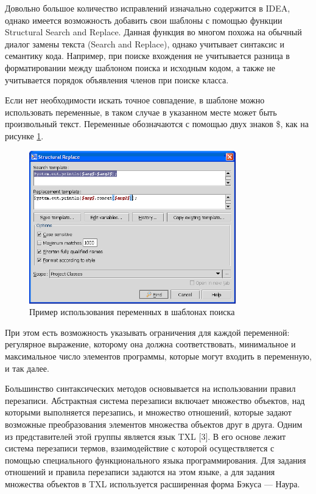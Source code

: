 Довольно большое количество исправлений изначально содержится в IDEA, однако имеется возможность добавить свои шаблоны с помощью функции Structural Search and Replace\cite{ideaSSR}. Данная функция во многом похожа на обычный диалог замены текста (Search and Replace), однако учитывает синтаксис и семантику кода. Например, при поиске вхождения не учитывается разница в форматировании между шаблоном поиска и исходным кодом, а также не учитывается порядок объявления членов при поиске класса.

Если нет необходимости искать точное совпадение, в шаблоне можно использовать переменные, в таком случае в указанном месте может быть произвольный текст. Переменные обозначаются с помощью двух знаков \$, как на рисунке \ref{fig:ssr}.

\begin{figure}[H]
	\centering
	\includegraphics[width=0.8\textwidth]{ssr.png}
	\caption{Пример использования переменных в шаблонах поиска}%
	\label{fig:ssr}
\end{figure}

При этом есть возможность указывать ограничения для каждой переменной: регулярное выражение, которому она должна соответствовать, минимальное и максимальное число элементов программы, которые могут входить в переменную, и так далее.

Большинство синтаксических методов основывается на использовании правил перезаписи. Абстрактная система перезаписи включает множество объектов, над которыми выполняется перезапись, и множество отношений, которые задают возможные преобразования элементов множества объектов друг в друга. Одним из представителей этой группы является язык TXL [3]. В его основе лежит система перезаписи термов, взаимодействие с которой осуществляется с помощью специального функционального языка программирования. Для задания отношений и правила перезаписи задаются на этом языке, а для задания множества объектов в TXL используется расширенная форма Бэкуса — Наура.

